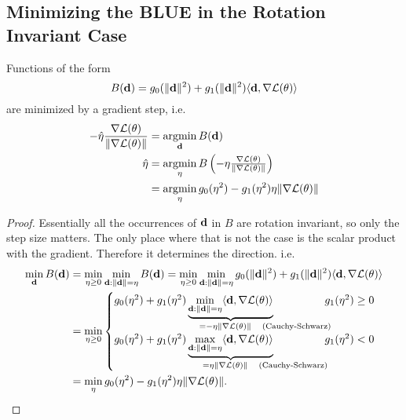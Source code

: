 \subsection{Minimizing the BLUE in the Rotation Invariant Case}

\begin{lemma}\label{lem: rotation invariant implies GD}
	Functions of the form
	\begin{equation*}
		B(\mathbf{d})
		= g_0(\|\mathbf{d}\|^2) + g_1(\|\mathbf{d}\|^2)\langle \mathbf{d}, \nabla\mathcal{L}(\theta)\rangle
	\end{equation*}
	are minimized by a gradient step, i.e.
	\begin{align}
		-\hat{\eta}\frac{\nabla\mathcal{L}(\theta)}{\|\nabla\mathcal{L}(\theta)\|}
		&= \operatorname*{argmin}_{\mathbf{d}}B(\mathbf{d})\\
		\hat{\eta} &\begin{aligned}[t]
			&=\operatorname*{argmin}_{\eta} B\left(-\eta \tfrac{\nabla\mathcal{L}(\theta)}{\|\nabla\mathcal{L}(\theta)\|}\right)\\
			&= \operatorname*{argmin}_{\eta} g_0(\eta^2) -  g_1(\eta^2)\eta\|\nabla\mathcal{L}(\theta)\|
		\end{aligned}
	\end{align}
\end{lemma}

\begin{proof}
	Essentially all the occurrences of \(\mathbf{d}\) in \(B\) are
	rotation invariant, so only the step size matters. The only place where that
	is not the case is the scalar product with the gradient. Therefore it
	determines the direction. i.e.
	\begin{align*}
		\min_{\step} B(\step)
		&= \min_{\lr\ge 0}\min_{\step:\|\step\|=\lr} B(\step)
		= \min_{\lr\ge 0}\min_{\step:\|\step\|=\lr}
		g_0(\|\step\|^2)	
		+ g_1(\|\step\|^2) \langle \step, \nabla\Loss(\param)\rangle\\
		&= \min_{\lr\ge 0}
		\begin{cases}
			g_0(\lr^2)	
			+ g_1(\lr^2)
			\underbrace{\min_{\step:\|\step\|=\lr}\langle \step, \nabla\Loss(\param)\rangle}_{
				= -\eta \|\nabla \Loss(\param)\| \quad \mathrlap{\text{(Cauchy-Schwarz)}}
			}\hphantom{\text{Schwarz}} & g_1(\lr^2) \ge 0
			\\
			g_0(\lr^2)	
			+ g_1(\lr^2)
			\underbrace{\max_{\step:\|\step\|=\lr}\langle \step, \nabla\Loss(\param)\rangle}_{
				= \eta \|\nabla \Loss(\param)\| \quad \mathrlap{\text{(Cauchy-Schwarz)}}
			}\hphantom{\text{Schwarz}} & g_1(\lr^2) < 0
		\end{cases}\\
		&= \min_{\lr} g_0(\lr^2)	
			- g_1(\lr^2)\lr \|\nabla\Loss(\param)\|.
		\qedhere
	\end{align*}
\end{proof}

